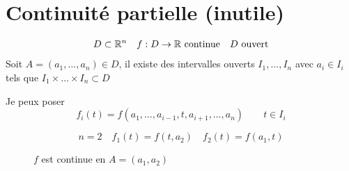 \section{Continuité partielle (inutile)}
\begin{align*}
    D \subset \mathbb{R}^n  \quad f: D \to \mathbb{R} \text{ continue} \quad D \text{ ouvert}
\end{align*}
Soit  $A = (a_1, \ldots, a_n) \in D$, il existe des intervalles ouverts $I_1, \ldots, I_n$ avec $a_i \in I_i$ tels que $I_1 \times \ldots \times I_n \subset D$ 
\par
Je peux poser 
\[
f_i(t) = f(a_1, \ldots, a_{i-1}, t, a_{i+1}, \ldots, a_n) \qquad t \in I_i
\] 
\begin{eg}
   \[
   n = 2 \quad f_1(t) = f(t, a_2) \quad f_2(t) = f(a_1, t)
   \]  
\begin{figure}[H]
    \centering
    \caption{$f$ est continue en  $A = (a_1, a_2)$}
    \label{fig:n-est-2-continuite-partielle}
\end{figure}
\end{eg}

